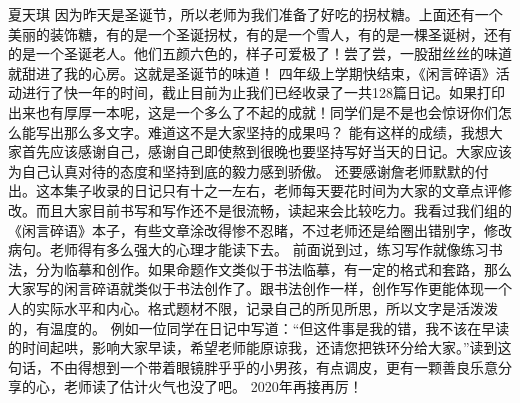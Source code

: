 {}\markdownRendererInterblockSeparator
{}夏天琪 \markdownRendererInterblockSeparator
{}因为昨天是圣诞节，所以老师为我们准备了好吃的拐杖糖。上面还有一个美丽的装饰糖，有的是一个圣诞拐杖，有的是一个雪人，有的是一棵圣诞树，还有的是一个圣诞老人。他们五颜六色的，样子可爱极了！尝了尝，一股甜丝丝的味道就甜进了我的心房。这就是圣诞节的味道！\markdownRendererInterblockSeparator
{}\markdownRendererInterblockSeparator
{}四年级上学期快结束，《闲言碎语》活动进行了快一年的时间，截止目前为止我们已经收录了一共128篇日记。如果打印出来也有厚厚一本呢，这是一个多么了不起的成就！同学们是不是也会惊讶你们怎么能写出那么多文字。难道这不是大家坚持的成果吗？\markdownRendererInterblockSeparator
{}能有这样的成绩，我想大家首先应该感谢自己，感谢自己即使熬到很晚也要坚持写好当天的日记。大家应该为自己认真对待的态度和坚持到底的毅力感到骄傲。\markdownRendererInterblockSeparator
{}还要感谢詹老师默默的付出。这本集子收录的日记只有十之一左右，老师每天要花时间为大家的文章点评修改。而且大家目前书写和写作还不是很流畅，读起来会比较吃力。我看过我们组的《闲言碎语》本子，有些文章涂改得惨不忍睹，不过老师还是给圈出错别字，修改病句。老师得有多么强大的心理才能读下去。\markdownRendererInterblockSeparator
{}前面说到过，练习写作就像练习书法，分为临摹和创作。如果命题作文类似于书法临摹，有一定的格式和套路，那么大家写的闲言碎语就类似于书法创作了。跟书法创作一样，创作写作更能体现一个人的实际水平和内心。格式题材不限，记录自己的所见所思，所以文字是活泼泼的，有温度的。\markdownRendererInterblockSeparator
{}例如一位同学在日记中写道：“但这件事是我的错，我不该在早读的时间起哄，影响大家早读，希望老师能原谅我，还请您把铁环分给大家。”读到这句话，不由得想到一个带着眼镜胖乎乎的小男孩，有点调皮，更有一颗善良乐意分享的心，老师读了估计火气也没了吧。\markdownRendererInterblockSeparator
{}2020年再接再厉！\relax